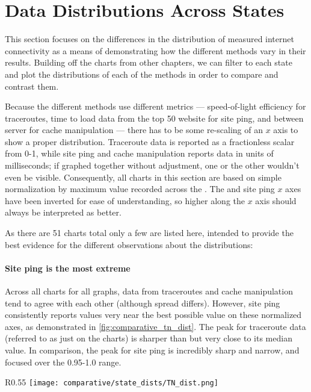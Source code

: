 \section{Data Distributions Across States}\label{sec:comparative-distribution}

This section focuses on the differences in the distribution of measured internet connectivity as a means of demonstrating how the different methods vary in their results. Building off the \kde charts from other chapters, we can filter to each state and plot the distributions of each of the methods in order to compare and contrast them.

Because the different methods use different metrics --- speed-of-light efficiency for traceroutes, time to load data from the top 50 website for site ping, and \rtt between \dns server for \dns cache manipulation --- there has to be some re-scaling of an $x$ axis to show a proper distribution. Traceroute data is reported as a fractionless scalar from 0-1, while site ping and \dns cache manipulation reports data in units of milliseconds; if graphed together without adjustment, one or the other wouldn't even be visible. Consequently, all charts in this section are based on simple normalization by maximum value recorded across the \us. The \dns and site ping $x$ axes have been inverted for ease of understanding, so higher along the $x$ axis should always be interpreted as better.

As there are 51 charts total only a few are listed here, intended to provide the best evidence for the different observations about the distributions:

\paragraph{Site ping is the most extreme} Across all \kde charts for all graphs, data from traceroutes and \dns cache manipulation tend to agree with each other (although spread differs). However, site ping consistently reports values very near the best possible value on these normalized axes, as demonstrated in \cref{fig:comparative_tn_dist}. The peak for traceroute data (referred to as just \caida on the charts) is sharper than \dns but very close to its median value. In comparison, the peak for site ping is incredibly sharp and narrow, and focused over the 0.95-1.0 range.

\begin{wrapfigure}[16]{R}{0.55\textwidth}
    \centering
    \texttt{[image: comparative/state\_dists/TN\_dist.png]}
    \caption{Tennessee data distributions}
    \label{fig:comparative_tn_dist}
\end{wrapfigure}

